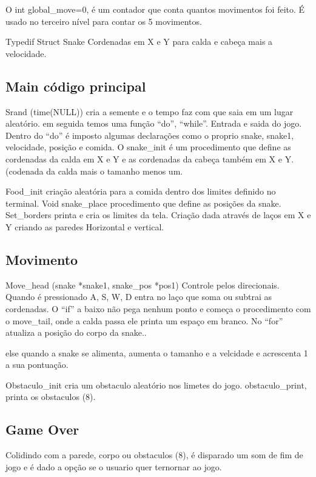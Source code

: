 \documentclass[journal]{IEEEtran}
\begin{document}
O int global_move=0, é um contador que conta quantos movimentos foi feito. É usado no terceiro nível para contar os 5 movimentos.

Typedif Struct Snake
Cordenadas em X e Y para calda e cabeça mais a velocidade.

\subsection{Main código principal}
Srand (time(NULL)) cria a semente e o tempo faz com que saia em um lugar aleatório.
em seguida temos uma função ``do'', ``while''. Entrada e saida do jogo.
Dentro do ``do'' é imposto algumas declarações como o proprio snake, snake1, velocidade, posição e comida.
O snake_init é um procedimento que define as cordenadas da calda em X e Y e as cordenadas da cabeça também em X e Y. (codenada da calda mais o tamanho menos um.

Food_init criação aleatória para a comida dentro dos limites definido no terminal.
Void snake_place procedimento que define as posições da snake.
Set_borders printa e cria os limites da tela. Criação dada através de laços em X e Y criando as paredes
Horizontal e vertical.

\subsection{Movimento}
Move_head (snake *snake1, snake_pos *pos1)
Controle pelos direcionais. Quando é pressionado A, S, W, D entra no laço que soma ou subtrai as cordenadas.
O ``if'' a baixo não pega nenhum ponto e começa o procedimento com o move_tail, onde a calda passa ele printa um espaço  em branco.
No ``for'' atualiza a posição do corpo da snake..

else quando a snake se alimenta, aumenta o tamanho e a velcidade e acrescenta 1 a sua pontuação.

Obstaculo_init cria um obstaculo aleatório nos limetes do jogo.
obstaculo_print, printa os obstaculos (8).

\subsection{Game Over}
Colidindo com a parede, corpo ou obstaculos (8), é disparado um som de fim de jogo e é dado a opção se o usuario quer ternornar ao jogo.
\end{document}

